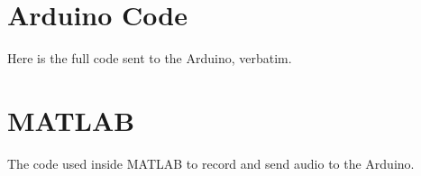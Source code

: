 
\begin{subappendices}
    \renewcommand{\thesection}{\Alph{section}}

    \section{Arduino Code}
    Here is the full code sent to the Arduino, verbatim.

    

    \newpage
    \section{MATLAB}
    The code used inside MATLAB to record and send audio to the Arduino.

    
\end{subappendices}